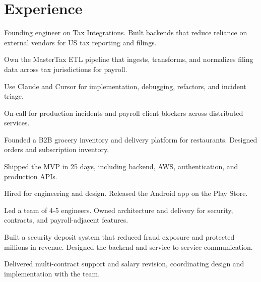 \documentclass[]{deep-resume-openfont}
\begin{document}
\begin{minipage}[t]{0.66\textwidth}

\section{Experience}
\entrysep
{}
\entrysep
\entrysep

\entrysep
\begin{tightemize}
\item Founding engineer on Tax Integrations. Built backends that reduce reliance on external vendors for US tax reporting and filings.
\item Own the MasterTax ETL pipeline that ingests, transforms, and normalizes filing data across tax jurisdictions for payroll.
\item Use Claude and Cursor for implementation, debugging, refactors, and incident triage.
\item On-call for production incidents and payroll client blockers across distributed services.
\end{tightemize}
\entrysep

\entrysep
\begin{tightemize}
\item Founded a B2B grocery inventory and delivery platform for restaurants. Designed orders and subscription inventory.
\item Shipped the MVP in 25 days, including backend, AWS, authentication, and production APIs.
\item Hired for engineering and design. Released the Android app on the Play Store.
\end{tightemize}
\entrysep

\entrysep
\begin{tightemize}
\item Led a team of 4-5 engineers. Owned architecture and delivery for security, contracts, and payroll-adjacent features.
\item Built a security deposit system that reduced fraud exposure and protected millions in revenue. Designed the backend and service-to-service communication.
\item Delivered multi-contract support and salary revision, coordinating design and implementation with the team.
\end{tightemize}
\entrysep


\end{minipage}
\end{document}
